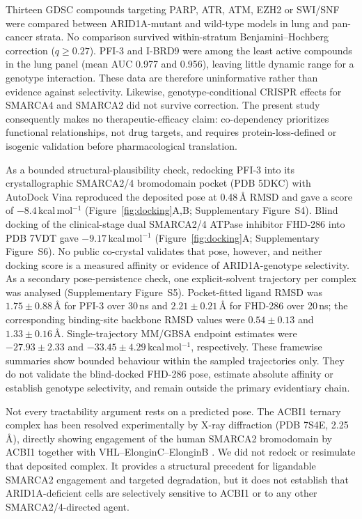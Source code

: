 \documentclass[11pt,a4paper]{article}
\begin{document}
Thirteen GDSC compounds targeting PARP, ATR, ATM, EZH2 or SWI/SNF were compared
between ARID1A-mutant and wild-type models in lung and pan-cancer strata. No
comparison survived within-stratum Benjamini--Hochberg correction ($q\ge0.27$).
PFI-3 and I-BRD9 were among the least active compounds in the lung panel (mean
AUC 0.977 and 0.956), leaving little dynamic range for a genotype interaction.
These data are therefore uninformative rather than evidence against selectivity.
Likewise, genotype-conditional CRISPR effects for SMARCA4 and SMARCA2 did not
survive correction. The present study consequently makes no therapeutic-efficacy
claim: co-dependency prioritizes functional relationships, not drug targets, and
requires protein-loss-defined or isogenic validation before pharmacological
translation.

As a bounded structural-plausibility check, redocking PFI-3
\citep{fedorov2015} into its crystallographic SMARCA2/4 bromodomain pocket (PDB
5DKC) with AutoDock Vina \citep{eberhardt2021} reproduced the deposited pose at
0.48\,\AA{} RMSD and gave a score of $-8.4$\,kcal\,mol$^{-1}$
(Figure~\ref{fig:docking}A,B; Supplementary Figure~S4). Blind docking of the
clinical-stage dual SMARCA2/4 ATPase inhibitor FHD-286 \citep{fhd286trial2025}
into PDB 7VDT gave $-9.17$\,kcal\,mol$^{-1}$ (Figure~\ref{fig:docking}A;
Supplementary Figure~S6). No
public co-crystal validates that pose, however, and neither docking score is a
measured affinity or evidence of ARID1A-genotype selectivity. As a secondary
pose-persistence check, one explicit-solvent trajectory per complex was analysed
(Supplementary Figure~S5). Pocket-fitted ligand RMSD was $1.75 \pm 0.88$\,\AA{}
for PFI-3 over 30\,ns and $2.21 \pm 0.21$\,\AA{} for FHD-286 over 20\,ns;
the corresponding binding-site backbone RMSD values were $0.54 \pm 0.13$ and
$1.33 \pm 0.16$\,\AA{}. Single-trajectory MM/GBSA endpoint estimates were
$-27.93 \pm 2.33$ and $-33.45 \pm 4.29$\,kcal\,mol$^{-1}$, respectively.
These framewise summaries show bounded behaviour within the sampled
trajectories only. They do not validate the blind-docked FHD-286 pose, estimate
absolute affinity or establish genotype selectivity, and remain outside the
primary evidentiary chain.

Not every tractability argument rests on a predicted pose. The ACBI1 ternary
complex has been resolved experimentally by X-ray diffraction (PDB 7S4E,
2.25\,\AA{}), directly showing engagement of the human SMARCA2 bromodomain by
ACBI1 together with VHL--ElonginC--ElonginB \citep{dixon2022}. We did not redock
or resimulate that deposited complex. It provides a structural precedent for
ligandable SMARCA2 engagement and targeted degradation, but it does not establish
that ARID1A-deficient cells are selectively sensitive to ACBI1 or to any other
SMARCA2/4-directed agent.
\end{document}
